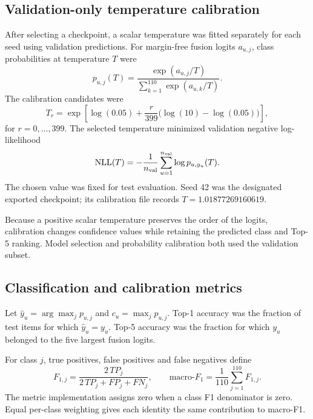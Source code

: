 \subsection{Validation-only temperature calibration}
After selecting a checkpoint, a scalar temperature was fitted separately for each seed using validation predictions. For margin-free fusion logits $a_{u,j}$, class probabilities at temperature $T$ were
\begin{equation}
 p_{u,j}(T)=
 \frac{\exp(a_{u,j}/T)}
      {\sum_{k=1}^{110}\exp(a_{u,k}/T)}.
 \label{eq:sv2-probability}
\end{equation}
The calibration candidates were
\begin{equation}
 T_r=\exp\left[
 \log(0.05)+\frac{r}{399}\bigl(\log(10)-\log(0.05)\bigr)
 \right],
 \label{eq:sv2-temperature-grid}
\end{equation}
for $r=0,\ldots,399$. The selected temperature minimized validation negative log-likelihood
\begin{equation}
 \mathrm{NLL}(T)
 =-\frac{1}{n_{\rm val}}\sum_{u=1}^{n_{\rm val}}
       \log p_{u,y_u}(T).
 \label{eq:sv2-nll}
\end{equation}
The chosen value was fixed for test evaluation. Seed 42 was the designated exported checkpoint; its calibration file records $T=1.01877269160619$.

Because a positive scalar temperature preserves the order of the logits, calibration changes confidence values while retaining the predicted class and Top-5 ranking. Model selection and probability calibration both used the validation subset.

\subsection{Classification and calibration metrics}
Let $\hat y_u=\arg\max_jp_{u,j}$ and $c_u=\max_jp_{u,j}$. Top-1 accuracy was the fraction of test items for which $\hat y_u=y_u$. Top-5 accuracy was the fraction for which $y_u$ belonged to the five largest fusion logits.

For class $j$, true positives, false positives and false negatives define
\begin{equation}
 F_{1,j}=\frac{2\,TP_j}{2\,TP_j+FP_j+FN_j},
 \qquad
 \mathrm{macro}\mbox{-}F_1=\frac{1}{110}\sum_{j=1}^{110}F_{1,j}.
 \label{eq:sv2-f1}
\end{equation}
The metric implementation assigns zero when a class F1 denominator is zero. Equal per-class weighting gives each identity the same contribution to macro-F1.

